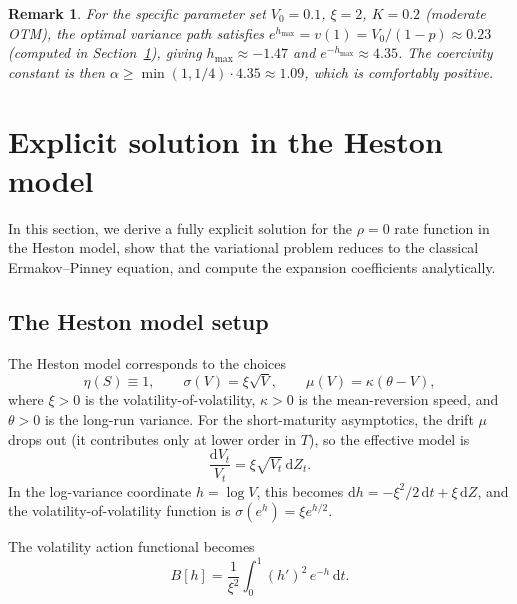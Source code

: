 \documentclass[11pt]{article}
\newtheorem{remark}[theorem]{Remark}
\theoremstyle{definition}
\newcommand{\dd}{\mathrm{d}}
\begin{document}
\begin{remark}
For the specific parameter set $V_0 = 0.1$, $\xi = 2$, $K = 0.2$ (moderate OTM), the optimal variance path satisfies $e^{h_{\max}} = v(1) = V_0/(1-p) \approx 0.23$ (computed in Section~\ref{sec:heston}), giving $h_{\max} \approx -1.47$ and $e^{-h_{\max}} \approx 4.35$. The coercivity constant is then $\alpha \geq \min(1, 1/4) \cdot 4.35 \approx 1.09$, which is comfortably positive.
\end{remark}

\section{Explicit solution in the Heston model}\label{sec:heston}

In this section, we derive a fully explicit solution for the $\rho=0$ rate function in the Heston model, show that the variational problem reduces to the classical Ermakov--Pinney equation, and compute the expansion coefficients analytically.

\subsection{The Heston model setup}\label{sec:heston_setup}

The Heston model corresponds to the choices
\begin{equation}\label{eq:heston_params}
  \eta(S) \equiv 1, \qquad \sigma(V) = \xi\sqrt{V}, \qquad \mu(V) = \kappa(\theta - V),
\end{equation}
where $\xi > 0$ is the volatility-of-volatility, $\kappa > 0$ is the mean-reversion speed, and $\theta > 0$ is the long-run variance. For the short-maturity asymptotics, the drift $\mu$ drops out (it contributes only at lower order in $T$), so the effective model is
\begin{equation}
  \frac{\dd V_t}{V_t} = \xi\sqrt{V_t}\,\dd Z_t.
\end{equation}
In the log-variance coordinate $h = \log V$, this becomes $\dd h = -\xi^2/2\,\dd t + \xi\,\dd Z$, and the volatility-of-volatility function is $\sigma(e^h) = \xi e^{h/2}$.

The volatility action functional becomes
\begin{equation}\label{eq:B_heston}
  B[h] = \frac{1}{\xi^2}\int_0^1 (h')^2\,e^{-h}\,\dd t.
\end{equation}
\end{document}
